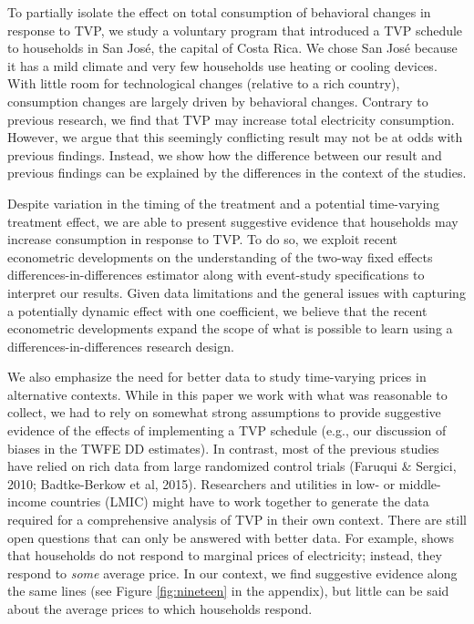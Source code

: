 \documentclass[12pt]{article}
\begin{document}
To partially isolate the effect on total consumption of behavioral changes in response to TVP, we study a voluntary program that introduced a TVP schedule to households in San José, the capital of Costa Rica. We chose San José because it has a mild climate and very few households use heating or cooling devices. With little room for technological changes (relative to a rich country), consumption changes are largely driven by behavioral changes. Contrary to previous research, we find that TVP may increase total electricity consumption. However, we argue that this seemingly conflicting result may not be at odds with previous findings. Instead, we show how the difference between our result and previous findings can be explained by the differences in the context of the studies.

Despite variation in the timing of the treatment and a potential time-varying treatment effect, we are able to present suggestive evidence that households may increase consumption in response to TVP. To do so, we exploit recent econometric developments on the understanding of the two-way fixed effects differences-in-differences estimator \citep{goodman-baconDifferenceinDifferencesVariationTreatment2018} along with event-study specifications to interpret our results. Given data limitations and the general issues with capturing a potentially dynamic effect with one coefficient, we believe that the recent econometric developments expand the scope of what is possible to learn using a differences-in-differences research design.

We also emphasize the need for better data to study time-varying prices in alternative contexts. While in this paper we work with what was reasonable to collect, we had to rely on somewhat strong assumptions to provide suggestive evidence of the effects of implementing a TVP schedule (e.g., our discussion of biases in the TWFE DD estimates). In contrast, most of the previous studies have relied on rich data from large randomized control trials (Faruqui $\&$  Sergici, 2010; Badtke-Berkow et al, 2015). Researchers and utilities in low- or middle-income countries (LMIC) might have to work together to generate the data required for a comprehensive analysis of TVP in their own context. There are still open questions that can only be answered with better data. For example, \citep{itoConsumersRespondMarginal2014} shows that households do not respond to marginal prices of electricity; instead, they respond to \emph{some} average price. In our context, we find suggestive evidence along the same lines (see Figure \ref{fig:nineteen} in the appendix), but little can be said about the average prices to which households respond.
\end{document}

